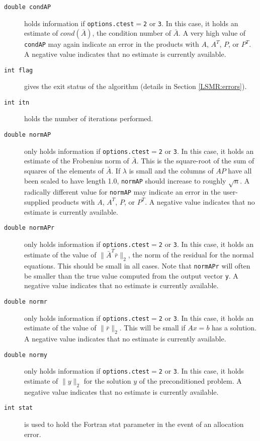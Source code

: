 \begin{description}

\item[\texttt{double condAP}]
   holds information if {\tt options.ctest}$ =${\tt 2} or {\tt 3}.
   In this case, it holds an estimate of $cond(\bar{A})$, the condition
   number of $\bar{A}$.  A very high value of {\tt condAP}
   may again indicate an error in the products 
   with $A$, $A^T$, $P$, or $P^T$. A negative value indicates
   that no estimate is currently available.

\item[\texttt{int flag}] gives the exit
   status of the algorithm (details in Section \ref{LSMR:errors}).

\item[\texttt{int itn}] holds the number
   of iterations performed.

\item[\texttt{double normAP}]
   only holds information if {\tt options.ctest}$ =${\tt 2} or {\tt 3}.
   In this case, it holds an estimate of the Frobenius norm of $\bar{A}$.
   This is the square-root of the sum of squares of the elements of $\bar{A}$.
   If $\lambda$ is small and the columns of $AP$ have all been scaled to have 
   length 1.0, {\tt normAP} should increase to roughly $\sqrt{n}$.
   A radically different value for {\tt normAP} may
   indicate an error in the user-supplied
   products with $A$, $A^T$, $P$, or $P^T$. A negative value
   indicates that no estimate is currently available.

\item[\texttt{double normAPr}] only holds information
   if {\tt options.ctest}$ =${\tt 2} or {\tt 3}. In this case, it holds an
   estimate of the  value of $\| \bar{A}^T\bar{r}\|_2$, the norm of the residual
   for the normal equations. This should be small in all cases.  Note that
   {\tt normAPr}  will often be smaller than the true value computed from the
   output vector {\tt y}. A negative value indicates that no estimate is
   currently available.
    
\item[\texttt{double normr}]
   only holds information if {\tt options.ctest}$ =${\tt 2} or {\tt 3}.
   In this case, it holds an estimate of the  value of $\|\bar{r}\|_2$.
   This will be small if $Ax = b$ has a solution. A negative value
   indicates that no estimate is currently available.
    
\item[\texttt{double normy}]
   only holds information if {\tt options.ctest}$ =${\tt 2} or {\tt 3}.
   In this case, it holds estimate of  $\|y\|_2$ for the  solution $y$
   of the preconditioned problem.
   A negative value indicates that no estimate is currently available.

\item[\texttt{int stat}] is used to hold
   the Fortran stat parameter in the event of an allocation error.

\end{description}



